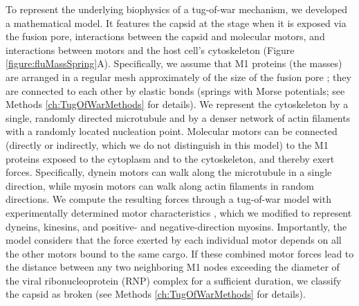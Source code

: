 To represent the underlying biophysics of a tug-of-war mechanism, we developed a mathematical model. It features the capsid at the stage when it is exposed via the fusion pore, interactions between the capsid and molecular motors, and interactions between motors and the host cell’s cytoskeleton (Figure \ref{figure:fluMassSpring}A). Specifically, we assume that M1 proteins (the masses) are arranged in a regular mesh approximately of the size of the fusion pore \cite{hilsch2014influenza}; they are connected to each other by elastic bonds (springs with Morse potentials; see Methods \ref{ch:TugOfWarMethods} for details). We represent the cytoskeleton by a single, randomly directed microtubule and by a denser network of actin filaments with a randomly located nucleation point. Molecular motors can be connected (directly or indirectly, which we do not distinguish in this model) to the M1 proteins exposed to the cytoplasm and to the cytoskeleton, and thereby exert forces. Specifically, dynein motors can walk along the microtubule in a single direction, while myosin motors can walk along actin filaments in random directions. We compute the resulting forces through a tug-of-war model with experimentally determined motor characteristics \cite{gennerich2007force, muller2008tug, norstrom2010unconventional}, which we modified to represent dyneins, kinesins, and positive- and negative-direction myosins. Importantly, the model considers that the force exerted by each individual motor depends on all the other motors bound to the same cargo. If these combined motor forces lead to the distance between any two neighboring M1 nodes exceeding the diameter of the viral ribonucleoprotein (RNP) complex for a sufficient duration, we classify the capsid as broken (see Methods \ref{ch:TugOfWarMethods} for details).

